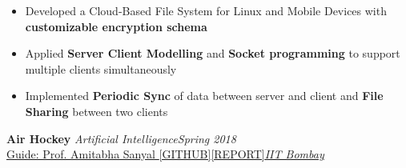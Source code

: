 \documentclass[10pt]{article}
\def\projectSpace{\vspace{-5pt}}
\begin{document}
 \begin{itemize}[itemsep = -0.75 mm, leftmargin=*]

 \item Developed a Cloud-Based File System for Linux and Mobile Devices with \textbf{ customizable encryption schema}
\item Applied \textbf{Server Client Modelling} and \textbf{Socket programming} to support multiple clients simultaneously
\item Implemented \textbf{Periodic Sync} of data between  server and client and \textbf{File Sharing} between two clients






\end{itemize}
\vspace*{8pt}

 \projectSpace

 \hspace*{-18pt}
\textbf{\large Air Hockey} \textemdash \textit{Artificial Intelligence}\hfill{\sl \small Spring 2018}\\
\href{https://www.cse.iitb.ac.in/~as/}{Guide: Prof. Amitabha Sanyal }\hspace{3pt}\href{https://github.com/yashkhem1/AirHockey}{[GITHUB]}\hspace{3pt}\href{https://drive.google.com/file/d/1_oCS_022FP37wvZjpinh_OMOUESHx7d1/view?usp=sharing}{[REPORT]}\hfill{\sl \small \href{http://www.iitb.ac.in/}{IIT Bombay}\ \ }\\
\vspace{1pt}
\end{document}
